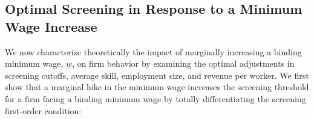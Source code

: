 \documentclass[11pt]{article}
\begin{document}




\subsection{Optimal Screening in Response to a Minimum Wage Increase}

We now characterize theoretically the impact of marginally increasing a binding minimum wage, $\underline{w}$, on firm behavior by examining the optimal adjustments in screening cutoffs, average skill, employment size, and revenue per worker. We first show that a marginal hike in the minimum wage increases the screening threshold for a firm facing a binding minimum wage by totally differentiating the screening first-order condition:
\end{document}
